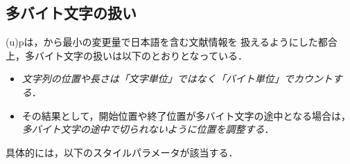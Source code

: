 \documentclass[a4paper,11pt,nomag,dvipdfmx]{jsarticle}
\def\pBibTeX{p\kern-.05em\BibTeX}
\def\pBibTeX{p\BibTeX}%
\begin{document}
\subsection{多バイト文字の扱い}\label{sec:substring}

(u)\pBibTeX は，\BibTeX から最小の変更量で日本語を含む文献情報を
扱えるようにした都合上，多バイト文字の扱いは以下のとおりとなっている．
\begin{itemize}
 \item \emph{文字列の位置や長さは「文字単位」ではなく「バイト単位」でカウントする}．
 \item その結果として，開始位置や終了位置が多バイト文字の途中となる場合は，
   \emph{多バイト文字の途中で切られないように位置を調整する}．
\end{itemize}

具体的には，以下のスタイルパラメータが該当する．
\end{document}
